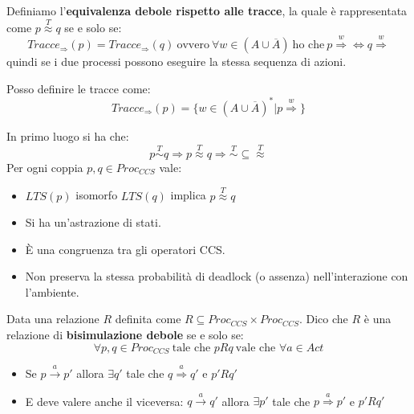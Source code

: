 \begin{definizione}
    Definiamo l'\textbf{equivalenza debole rispetto alle tracce}, la quale è
    rappresentata come $p \stackrel{T}{\approx} q$ se e solo se:
    \begin{equation}
        Tracce_{\Rightarrow} (p) = Tracce_{\Rightarrow}(q) \ \text{ovvero} \
        \forall w \in (A \cup \overline{A}) \ \text{ho che} \ p
        \stackrel{w}{\Rightarrow} \iff q \stackrel{w}{\Rightarrow}
    \end{equation}
    quindi se i due processi possono eseguire la stessa sequenza di azioni.
\end{definizione}
Posso definire le tracce come:
\begin{equation}
    Tracce_{\Rightarrow}(p) = \{w \in (A \cup \overline{A})^{\ast} | p
    \stackrel{w}{\Rightarrow}\}
\end{equation}
\begin{osservazione}
    In primo luogo si ha che:
    \begin{equation}
        p \stackrel{T}{\sim} q \Rightarrow p \stackrel{T}{\approx} q \Rightarrow
        \stackrel{T}{\sim} \subseteq \stackrel{T}{\approx}
    \end{equation}
    Per ogni coppia $p, q \in Proc_{CCS}$ vale:
    \begin{itemize}
        \item $LTS(p)$ isomorfo $LTS(q)$ implica $p \stackrel{T}{\approx} q$
        \item Si ha un'astrazione di stati.
        \item È una congruenza tra gli operatori CCS.
        \item Non preserva la stessa probabilità di deadlock (o assenza)
              nell'interazione con l'ambiente.
    \end{itemize}
\end{osservazione}
\begin{definizione}
    Data una relazione $R$ definita come $R \subseteq Proc_{CCS} \times Proc_{CCS}$.
    Dico che $R$ è una relazione di \textbf{bisimulazione debole} se e solo se:
    \begin{equation}
        \forall p, q \in Proc_{CCS} \ \text{tale che } p R q \ \text{vale che }
        \forall a \in Act
    \end{equation}
    \begin{itemize}
        \item Se $p \xrightarrow{a} p'$ allora $\exists q'$ tale che
              $q \stackrel{a}{\Rightarrow} q'$ e $p'Rq'$
        \item E deve valere anche il viceversa: $q \xrightarrow{a} q'$ allora
              $\exists p'$ tale che $p \stackrel{a}{\Rightarrow} p'$ e $p'Rq'$
    \end{itemize}
\end{definizione}
